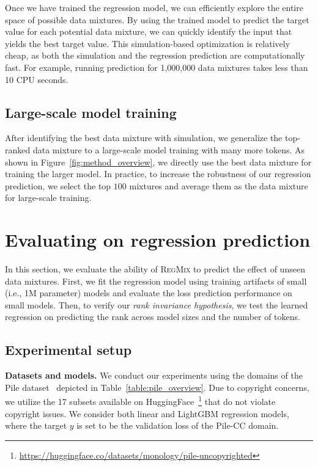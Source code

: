 \documentclass{article}
\theoremstyle{definition}
\theoremstyle{remark}
\newcommand{\ourmethod}{\textsc{RegMix}\xspace}
\begin{document}
Once we have trained the regression model, we can efficiently explore the entire space of possible data mixtures.
By using the trained model to predict the target value for each potential data mixture, we can quickly identify the input that yields the best target value. This simulation-based optimization is relatively cheap, as both the simulation and the regression prediction are computationally fast. For example, running prediction for 1,000,000 data mixtures takes less than 10 CPU seconds.

\subsection{Large-scale model training}

After identifying the best data mixture with simulation, we generalize the top-ranked data mixture to a large-scale model training with many more tokens.  As shown in Figure~\ref{fig:method_overview}, we directly use the best data mixture for training the larger model. In practice, to increase the robustness of our regression prediction, we select the top $100$ mixtures and average them as the data mixture for large-scale training. 

\section{Evaluating on regression prediction}

\label{sec:evaluate_regression}

In this section, we evaluate the ability of \ourmethod to predict the effect of unseen data mixtures.
First, we fit the regression model using training artifacts of small (i.e., 1M parameter) models and evaluate the loss prediction performance on small models.
Then, to verify our \textit{rank invariance hypothesis}, we test the learned regression on predicting the rank across model sizes and the number of tokens.

\subsection{Experimental setup}

\textbf{Datasets and models.}\;\;
We conduct our experiments using the domains of the Pile dataset~\citep{the_pile_corpus} depicted in Table~\ref{table:pile_overview}.
Due to copyright concerns, we utilize the 17 subsets available on HuggingFace~\footnote{\url{https://huggingface.co/datasets/monology/pile-uncopyrighted}} that do not violate copyright issues.
We consider both linear and LightGBM regression models, where the target $y$ is set to be the validation loss of the Pile-CC domain.
\end{document}
